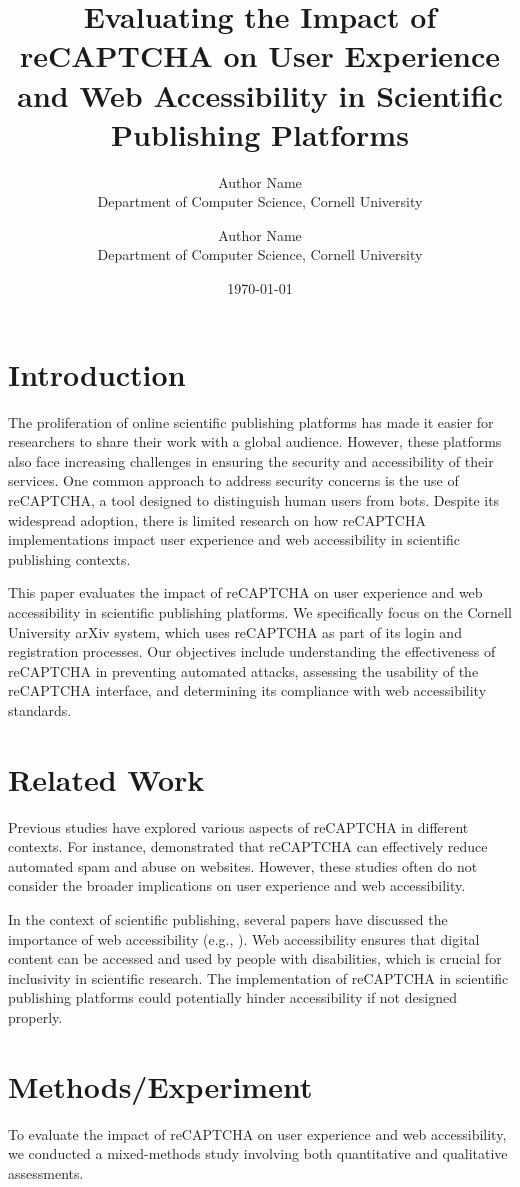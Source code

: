 \documentclass{article}
\title{Evaluating the Impact of reCAPTCHA on User Experience and Web Accessibility in Scientific Publishing Platforms}
\author{Author Name \\
Department of Computer Science, Cornell University \\
\and
Author Name \\
Department of Computer Science, Cornell University}
\date{\today}
\begin{document}
\maketitle

\section{Introduction}
The proliferation of online scientific publishing platforms has made it easier for researchers to share their work with a global audience. However, these platforms also face increasing challenges in ensuring the security and accessibility of their services. One common approach to address security concerns is the use of reCAPTCHA, a tool designed to distinguish human users from bots. Despite its widespread adoption, there is limited research on how reCAPTCHA implementations impact user experience and web accessibility in scientific publishing contexts.

This paper evaluates the impact of reCAPTCHA on user experience and web accessibility in scientific publishing platforms. We specifically focus on the Cornell University arXiv system, which uses reCAPTCHA as part of its login and registration processes. Our objectives include understanding the effectiveness of reCAPTCHA in preventing automated attacks, assessing the usability of the reCAPTCHA interface, and determining its compliance with web accessibility standards.

\section{Related Work}
Previous studies have explored various aspects of reCAPTCHA in different contexts. For instance, \cite{reCAPTCHA_effectiveness} demonstrated that reCAPTCHA can effectively reduce automated spam and abuse on websites. However, these studies often do not consider the broader implications on user experience and web accessibility.

In the context of scientific publishing, several papers have discussed the importance of web accessibility (e.g., \cite{web_accessibility}). Web accessibility ensures that digital content can be accessed and used by people with disabilities, which is crucial for inclusivity in scientific research. The implementation of reCAPTCHA in scientific publishing platforms could potentially hinder accessibility if not designed properly.

\section{Methods/Experiment}
To evaluate the impact of reCAPTCHA on user experience and web accessibility, we conducted a mixed-methods study involving both quantitative and qualitative assessments. 
\end{document}
